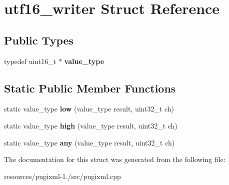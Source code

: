 \hypertarget{structutf16__writer}{\section{utf16\+\_\+writer Struct Reference}
\label{structutf16__writer}
}
\subsection*{Public Types}
\begin{DoxyCompactItemize}
\item 
\hypertarget{structutf16__writer_a527b705eaf5099167b8bc42423ce918c}{typedef uint16\+\_\+t $\ast$ {\bfseries value\+\_\+type}}\label{structutf16__writer_a527b705eaf5099167b8bc42423ce918c}

\end{DoxyCompactItemize}
\subsection*{Static Public Member Functions}
\begin{DoxyCompactItemize}
\item 
\hypertarget{structutf16__writer_ab11fef721a8b38de5e315d2e75d12956}{static value\+\_\+type {\bfseries low} (value\+\_\+type result, uint32\+\_\+t ch)}\label{structutf16__writer_ab11fef721a8b38de5e315d2e75d12956}

\item 
\hypertarget{structutf16__writer_a01b6ce1a567dea11daead3ca83f42d5c}{static value\+\_\+type {\bfseries high} (value\+\_\+type result, uint32\+\_\+t ch)}\label{structutf16__writer_a01b6ce1a567dea11daead3ca83f42d5c}

\item 
\hypertarget{structutf16__writer_ac14e06db126fbbef4be7efdb80fbdf4a}{static value\+\_\+type {\bfseries any} (value\+\_\+type result, uint32\+\_\+t ch)}\label{structutf16__writer_ac14e06db126fbbef4be7efdb80fbdf4a}

\end{DoxyCompactItemize}


The documentation for this struct was generated from the following file\+:\begin{DoxyCompactItemize}
\item 
resources/pugixml-\/1./src/pugixml.\+cpp\end{DoxyCompactItemize}
